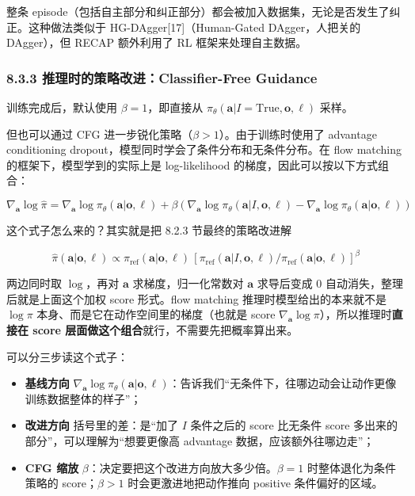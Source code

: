\documentclass[
  chinese,
]{ctexart}
\providecommand{\tightlist}{%
  \setlength{\itemsep}{0pt}\setlength{\parskip}{0pt}}
\begin{document}
整条
episode（包括自主部分和纠正部分）都会被加入数据集，无论是否发生了纠正。这种做法类似于
HG-DAgger{[}17{]}（Human-Gated DAgger，人把关的 DAgger），但 RECAP
额外利用了 RL 框架来处理自主数据。

\subsubsection{8.3.3 推理时的策略改进：Classifier-Free
Guidance}\label{ux63a8ux7406ux65f6ux7684ux7b56ux7565ux6539ux8fdbclassifier-free-guidance}

训练完成后，默认使用 \(\beta = 1\)，即直接从
\(\pi_\theta(\mathbf{a} | I = \text{True}, \mathbf{o}, \ell)\) 采样。

但也可以通过 CFG 进一步锐化策略（\(\beta > 1\)）。由于训练时使用了
advantage conditioning dropout，模型同时学会了条件分布和无条件分布。在
flow matching 的框架下，模型学到的实际上是 log-likelihood
的梯度，因此可以按以下方式组合：

\[
\nabla_\mathbf{a} \log \hat{\pi} = \nabla_\mathbf{a} \log \pi_\theta(\mathbf{a} | \mathbf{o}, \ell) + \beta \left(\nabla_\mathbf{a} \log \pi_\theta(\mathbf{a} | I, \mathbf{o}, \ell) - \nabla_\mathbf{a} \log \pi_\theta(\mathbf{a} | \mathbf{o}, \ell)\right)
\]

这个式子怎么来的？其实就是把 8.2.3 节最终的策略改进解

\[\hat{\pi}(\mathbf{a}|\mathbf{o},\ell) \propto \pi_\text{ref}(\mathbf{a}|\mathbf{o},\ell)\,\left[\pi_\text{ref}(\mathbf{a}|I,\mathbf{o},\ell)/\pi_\text{ref}(\mathbf{a}|\mathbf{o},\ell)\right]^\beta\]

两边同时取 \(\log\)，再对 \(\mathbf{a}\) 求梯度，归一化常数对
\(\mathbf{a}\) 求导后变成 0 自动消失，整理后就是上面这个加权 score
形式。flow matching 推理时模型给出的本来就不是 \(\log\pi\)
本身、而是它在动作空间里的梯度（也就是 score
\(\nabla_\mathbf{a}\log\pi\)），所以推理时\textbf{直接在 score
层面做这个组合}就行，不需要先把概率算出来。

可以分三步读这个式子：

\begin{itemize}
\tightlist
\item
  \textbf{基线方向}
  \(\nabla_\mathbf{a}\log\pi_\theta(\mathbf{a}|\mathbf{o},\ell)\)：告诉我们``无条件下，往哪边动会让动作更像训练数据整体的样子''；
\item
  \textbf{改进方向} 括号里的差：是``加了 \(I\) 条件之后的 score 比无条件
  score 多出来的部分''，可以理解为``想要更像高 advantage
  数据，应该额外往哪边走''；
\item
  \textbf{CFG 缩放}
  \(\beta\)：决定要把这个改进方向放大多少倍。\(\beta=1\)
  时整体退化为条件策略的 score；\(\beta>1\) 时会更激进地把动作推向
  positive 条件偏好的区域。
\end{itemize}
\end{document}
